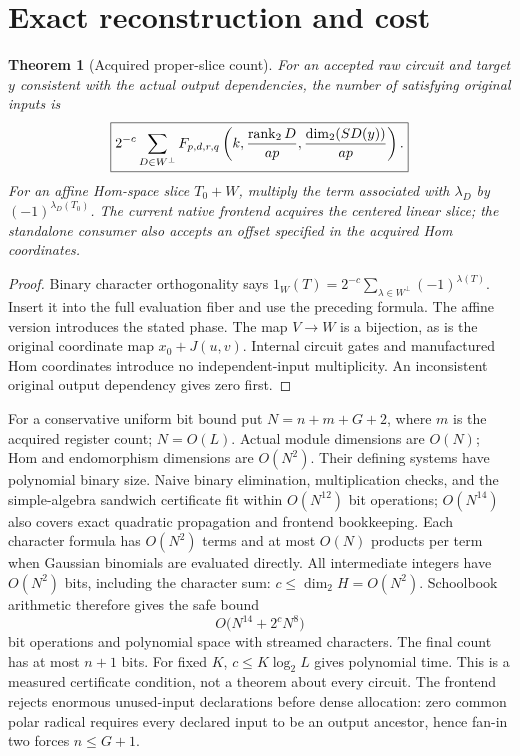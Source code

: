\documentclass[11pt]{article}
\newtheorem{theorem}{Theorem}\newtheorem{lemma}{Lemma}
\begin{document}
\section{Exact reconstruction and cost}
\begin{theorem}[Acquired proper-slice count]
For an accepted raw circuit and target $y$ consistent with the actual output
dependencies, the number of satisfying original inputs is
\[
 \boxed{2^{-c}\sum_{D\in W^\perp}
 F_{p,d,r,q}\left(k,\frac{\operatorname{rank}_2D}{ap},
                        \frac{\dim_2(SD(y))}{ap}\right).}
\]
For an affine Hom-space slice $T_0+W$, multiply the term associated with
$\lambda_D$ by $(-1)^{\lambda_D(T_0)}$. The current native frontend acquires
the centered linear slice; the standalone consumer also accepts an offset
specified in the acquired Hom coordinates.
\end{theorem}
\begin{proof}
Binary character orthogonality says
$1_W(T)=2^{-c}\sum_{\lambda\in W^\perp}(-1)^{\lambda(T)}$.
Insert it into the full evaluation fiber and use the preceding formula.
The affine version introduces the stated phase. The map $V\to W$ is a
bijection, as is the original coordinate map $x_0+J(u,v)$. Internal circuit
gates and manufactured Hom coordinates introduce no independent-input
multiplicity. An inconsistent original output dependency gives zero first.
\end{proof}

For a conservative uniform bit bound put $N=n+m+G+2$, where $m$ is the acquired
register count; $N=O(L)$. Actual module dimensions are $O(N)$; Hom and
endomorphism dimensions are $O(N^2)$. Their defining systems have polynomial
binary size. Naive binary elimination, multiplication checks, and the
simple-algebra sandwich certificate fit within $O(N^{12})$ bit operations;
$O(N^{14})$ also covers exact quadratic propagation and frontend bookkeeping.
Each character formula has $O(N^2)$ terms and at most $O(N)$ products per term
when Gaussian binomials are evaluated directly. All intermediate integers have
$O(N^2)$ bits, including the character sum: $c\leq\dim_2H=O(N^2)$.
Schoolbook arithmetic therefore gives the safe bound
\[
 O\bigl(N^{14}+2^cN^8\bigr)
\]
bit operations and polynomial space with streamed characters. The final count
has at most $n+1$ bits. For fixed $K$, $c\leq K\log_2L$ gives polynomial time.
This is a measured certificate condition, not a theorem about every circuit.
The frontend rejects enormous unused-input declarations before dense
allocation: zero common polar radical requires every declared input to be an
output ancestor, hence fan-in two forces $n\leq G+1$.
\end{document}
